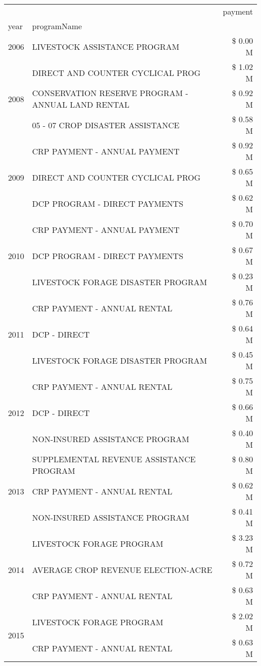 \begin{tabular}{llr}
\toprule
 &  & payment \\
year & programName &  \\
\midrule
2006 & LIVESTOCK ASSISTANCE PROGRAM & \$ 0.00 M \\
\cline{1-3}
\multirow[t]{3}{*}{2008} & DIRECT AND COUNTER CYCLICAL PROG & \$ 1.02 M \\
 & CONSERVATION RESERVE PROGRAM - ANNUAL LAND RENTAL & \$ 0.92 M \\
 & 05 - 07 CROP DISASTER ASSISTANCE & \$ 0.58 M \\
\cline{1-3}
\multirow[t]{3}{*}{2009} & CRP PAYMENT - ANNUAL PAYMENT & \$ 0.92 M \\
 & DIRECT AND COUNTER CYCLICAL PROG & \$ 0.65 M \\
 & DCP PROGRAM - DIRECT PAYMENTS & \$ 0.62 M \\
\cline{1-3}
\multirow[t]{3}{*}{2010} & CRP PAYMENT - ANNUAL PAYMENT & \$ 0.70 M \\
 & DCP PROGRAM - DIRECT PAYMENTS & \$ 0.67 M \\
 & LIVESTOCK FORAGE DISASTER  PROGRAM & \$ 0.23 M \\
\cline{1-3}
\multirow[t]{3}{*}{2011} & CRP PAYMENT - ANNUAL RENTAL & \$ 0.76 M \\
 & DCP - DIRECT & \$ 0.64 M \\
 & LIVESTOCK FORAGE DISASTER PROGRAM & \$ 0.45 M \\
\cline{1-3}
\multirow[t]{3}{*}{2012} & CRP PAYMENT - ANNUAL RENTAL & \$ 0.75 M \\
 & DCP - DIRECT & \$ 0.66 M \\
 & NON-INSURED ASSISTANCE PROGRAM & \$ 0.40 M \\
\cline{1-3}
\multirow[t]{3}{*}{2013} & SUPPLEMENTAL REVENUE ASSISTANCE PROGRAM & \$ 0.80 M \\
 & CRP PAYMENT - ANNUAL RENTAL & \$ 0.62 M \\
 & NON-INSURED ASSISTANCE PROGRAM & \$ 0.41 M \\
\cline{1-3}
\multirow[t]{3}{*}{2014} & LIVESTOCK FORAGE PROGRAM & \$ 3.23 M \\
 & AVERAGE CROP REVENUE ELECTION-ACRE & \$ 0.72 M \\
 & CRP PAYMENT - ANNUAL RENTAL & \$ 0.63 M \\
\cline{1-3}
\multirow[t]{3}{*}{2015} & LIVESTOCK FORAGE PROGRAM & \$ 2.02 M \\
 & CRP PAYMENT - ANNUAL RENTAL & \$ 0.63 M \\

\end{tabular}
